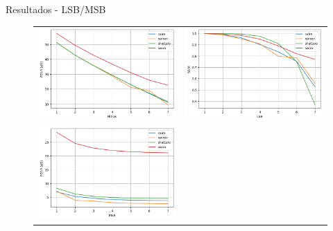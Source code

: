 \documentclass[]{beamer}
\begin{document}
\begin{frame}{Resultados - LSB/MSB}
\begin{figure}
    \begin{tabular}{cc}
         \includegraphics[scale=0.3]{Imagens/resultados-lsb-psnr.png} &   
         \includegraphics[scale=0.3]{Imagens/resultados-lsb-ssim.png} \\
         \includegraphics[scale=0.3]{Imagens/resultados-msb-psnr.png} &   

\end{tabular}
\end{figure}
\end{frame}
\end{document}
